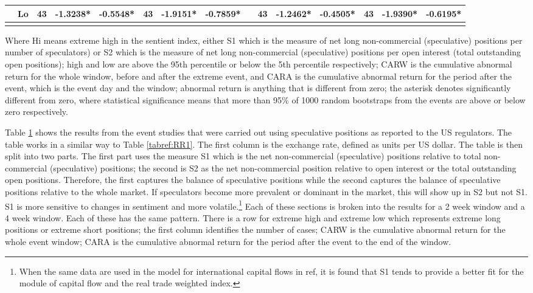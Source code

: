 \documentclass[12pt, a4paper, oneside]{article} %
\begin{document}
\begin{landscape}
\begin{table}[ht]
\begin{threeparttable}
\begin{tabular}{llccccccccccccc}
& Lo & 43 &-1.3238* & -0.5548* & 43 & -1.9151* & -0.7859* & & 43 & -1.2462* & -0.4505*  &43 & -1.9390*  & -0.6195*  \\
\hline
\label{tabref:SP1}
\end{tabular}
\begin{tablenotes}
\small 
\item Where Hi means extreme high in the sentient index, either S1 which is the measure of net long non-commercial (speculative) positions per number of speculators) or S2 which is the measure of net long non-commercial (speculative) positions per open interest (total outstanding open positions); high and low are above the 95th percentile or below the 5th percentile respectively; CARW is the cumulative abnormal return for the whole window, before and after the extreme event, and CARA is the cumulative abnormal return for the period after the event, which is the event day and the window; abnormal return is anything that is different from zero; the asterisk denotes significantly different from zero, where statistical significance means that more than 95\% of 1000 random bootstraps from the events are above or below zero respectively.   
\end{tablenotes}	
\end{threeparttable}  
\end{table}
\end{landscape}

Table \ref{tabref:SP1} shows the results from the event studies that were carried out using speculative positions as reported to the US regulators.  The table works in a similar way to Table \ref{tabref:RR1}.  The first column is the exchange rate, defined as units per US dollar.  The table is then split into two parts.  The first part uses the measure S1 which is the net non-commercial (speculative) positions relative to total non-commercial (speculative) positions; the second is S2 as the net non-commercial position relative to open interest or the total outstanding open positions.  Therefore, the first captures the balance of speculative positions while the second captures the balance of speculative positions relative to the whole market.  If speculators become more prevalent or dominant in the market, this will show up in S2 but not S1.  S1 is more sensitive to changes in sentiment and more volatile.\footnote{When the same data are used in the model for international capital flows in ref, it is found that S1 tends to provide a better fit for the module of capital flow and the real trade weighted index.} Each of these sections is broken into the results for a 2 week window and a 4 week window.  Each of these has the same pattern.   There is a row for extreme high and extreme low which represents extreme long positions or extreme short positions; the first  column identifies the number of cases; CARW is the cumulative abnormal return for the whole event window; CARA is the cumulative abnormal return for the period after the event to the end of the window.     
\end{document}
